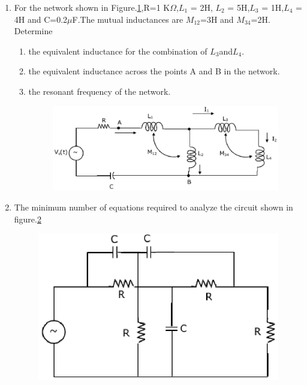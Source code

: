 \documentclass[journal,12pt,twocolumn]{IEEEtran}
\begin{document}
\begin{enumerate}
\item For the network shown in Figure.\ref{fig46},R=1 K$\Omega$,$L_{1}$ = 2H, $L_{2}$ = 5H,$L_{3}$ = 1H,$L_{4}$ = 4H and C=0.2$\mu$F.The mutual inductances are $M_{12}$=3H and $M_{34}$=2H. Determine
\begin{enumerate}
\setlength\itemsep{2em}
\item the equivalent inductance for the combination of $L_{3}$and$L_{4}$.
\item the equivalent inductance across the points A and B in the network.
\item the resonant frequency of the network.
\begin{figure}[!h]
\begin{center}
\includegraphics[scale=0.5]{./figs/fig46.eps}
\caption{}
\label{fig46}
\end{center}
\end{figure}
\end{enumerate}


\item The minimum number of equations required to analyze the circuit shown in figure.\ref{fig47}
\begin{enumerate}
\setlength\itemsep{2em}
\begin{figure}[!h]
\begin{center}
\includegraphics[scale=0.5]{./figs/fig47.eps}
\caption{}
\label{fig47}
\end{center}
\end{figure}
\end{enumerate}


\end{enumerate}
\end{document}
